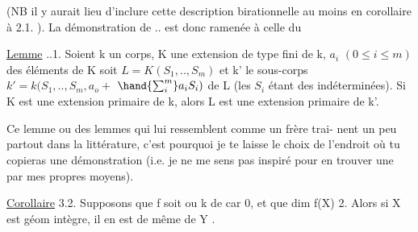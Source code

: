 
(NB il y aurait lieu d'inclure cette description birationnelle au moins
en corollaire à 2.1. ). La démonstration de .. est donc ramenée à
celle du

\uline{Lemme} ..1.  Soient k un corps, K une extension de type fini de k, 
$a_i$ $(0\leqslant i\leqslant m)$ des éléments de K  
 soit $L = K(S_1,..,S_m)$ et k' le sous-corps $k'= k(S_1,..,S_m,a_o +$
$\hand{\sum_{i}^{m}}a_iS_i)$ de L (les $S_i$ étant des indéterminées). \hand{,} Si K est une
extension primaire de k, alors L est une extension primaire de k'.

 Ce lemme\hand{,} ou des lemmes qui lui ressemblent comme un frère\hand{,} trai-%
nent un peu partout dans la littérature, c'est pourquoi je te laisse le
choix de l'endroit où tu copieras une démonstration (i.e. je ne me sens
pas inspiré pour en trouver une par mes propres moyens).

\uline{Corollaire} 3.2. Supposons que f soit   ou k de car 0,
et que dim f(X) 2. Alors si X est géom intègre, il en est de même de
Y .

